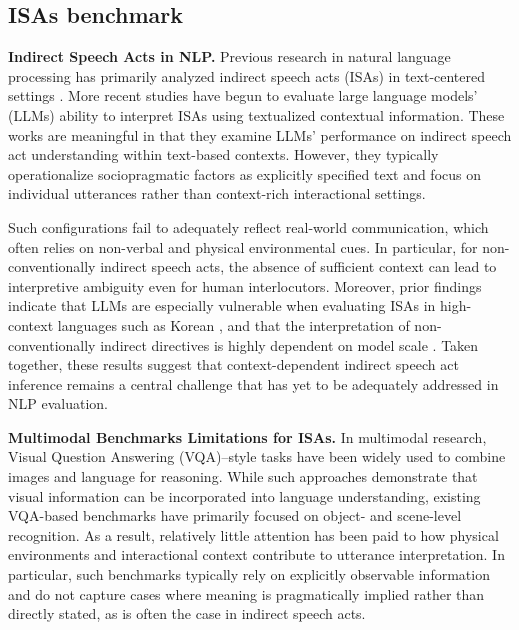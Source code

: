 \documentclass[11pt]{article}
\begin{document}
\subsection {ISAs benchmark}

\textbf{Indirect Speech Acts in NLP.}
Previous research in natural language processing has primarily analyzed indirect speech acts (ISAs) in text-centered settings \citep{allen1980analyzing, wilske2006service, briggs2013hybrid}. More recent studies have begun to evaluate large language models’ (LLMs) ability to interpret ISAs using textualized contextual information. These works are meaningful in that they examine LLMs’ performance on indirect speech act understanding within text-based contexts. However, they typically operationalize sociopragmatic factors as explicitly specified text and focus on individual utterances rather than context-rich interactional settings.

Such configurations fail to adequately reflect real-world communication, which often relies on non-verbal and physical environmental cues. In particular, for non-conventionally indirect speech acts, the absence of sufficient context can lead to interpretive ambiguity even for human interlocutors. Moreover, prior findings indicate that LLMs are especially vulnerable when evaluating ISAs in high-context languages such as Korean \citep{koo2025evaluating}, and that the interpretation of non-conventionally indirect directives is highly dependent on model scale \citep{orsini2025direct}. Taken together, these results suggest that context-dependent indirect speech act inference remains a central challenge that has yet to be adequately addressed in NLP evaluation.

\textbf{Multimodal Benchmarks Limitations for ISAs.}
In multimodal research, Visual Question Answering (VQA)–style tasks have been widely used to combine images and language for reasoning\citep{agrawal2016analyzing, das2017visual,goyal2017making}. While such approaches demonstrate that visual information can be incorporated into language understanding, existing VQA-based benchmarks have primarily focused on object- and scene-level recognition. As a result, relatively little attention has been paid to how physical environments and interactional context contribute to utterance interpretation. In particular, such benchmarks typically rely on explicitly observable information and do not capture cases where meaning is pragmatically implied rather than directly stated, as is often the case in indirect speech acts.
\end{document}
